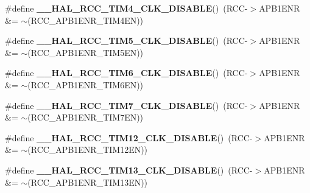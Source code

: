 \begin{DoxyCompactItemize}
\#define {\bfseries \+\_\+\+\_\+\+H\+A\+L\+\_\+\+R\+C\+C\+\_\+\+T\+I\+M4\+\_\+\+C\+L\+K\+\_\+\+D\+I\+S\+A\+B\+LE}()~(R\+CC-\/$>$A\+P\+B1\+E\+NR \&= $\sim$(R\+C\+C\+\_\+\+A\+P\+B1\+E\+N\+R\+\_\+\+T\+I\+M4\+EN))
\item 
\mbox{\label{group___r_c_c_ex___peripheral___clock___enable___disable_ga44f246a1407fadc350e416e4c3256f6e}} 
\#define {\bfseries \+\_\+\+\_\+\+H\+A\+L\+\_\+\+R\+C\+C\+\_\+\+T\+I\+M5\+\_\+\+C\+L\+K\+\_\+\+D\+I\+S\+A\+B\+LE}()~(R\+CC-\/$>$A\+P\+B1\+E\+NR \&= $\sim$(R\+C\+C\+\_\+\+A\+P\+B1\+E\+N\+R\+\_\+\+T\+I\+M5\+EN))
\item 
\mbox{\label{group___r_c_c_ex___peripheral___clock___enable___disable_ga1ee14a6e314a50eee7a1a09482a25abf}} 
\#define {\bfseries \+\_\+\+\_\+\+H\+A\+L\+\_\+\+R\+C\+C\+\_\+\+T\+I\+M6\+\_\+\+C\+L\+K\+\_\+\+D\+I\+S\+A\+B\+LE}()~(R\+CC-\/$>$A\+P\+B1\+E\+NR \&= $\sim$(R\+C\+C\+\_\+\+A\+P\+B1\+E\+N\+R\+\_\+\+T\+I\+M6\+EN))
\item 
\mbox{\label{group___r_c_c_ex___peripheral___clock___enable___disable_ga865f11c3f70a9b85ebc5f09baf60eec9}} 
\#define {\bfseries \+\_\+\+\_\+\+H\+A\+L\+\_\+\+R\+C\+C\+\_\+\+T\+I\+M7\+\_\+\+C\+L\+K\+\_\+\+D\+I\+S\+A\+B\+LE}()~(R\+CC-\/$>$A\+P\+B1\+E\+NR \&= $\sim$(R\+C\+C\+\_\+\+A\+P\+B1\+E\+N\+R\+\_\+\+T\+I\+M7\+EN))
\item 
\mbox{\label{group___r_c_c_ex___peripheral___clock___enable___disable_ga40b70e57e0b7741e6f62d1f2a25b0a3e}} 
\#define {\bfseries \+\_\+\+\_\+\+H\+A\+L\+\_\+\+R\+C\+C\+\_\+\+T\+I\+M12\+\_\+\+C\+L\+K\+\_\+\+D\+I\+S\+A\+B\+LE}()~(R\+CC-\/$>$A\+P\+B1\+E\+NR \&= $\sim$(R\+C\+C\+\_\+\+A\+P\+B1\+E\+N\+R\+\_\+\+T\+I\+M12\+EN))
\item 
\mbox{\label{group___r_c_c_ex___peripheral___clock___enable___disable_ga501dca0467cb5d6119144dbab79243f6}} 
\#define {\bfseries \+\_\+\+\_\+\+H\+A\+L\+\_\+\+R\+C\+C\+\_\+\+T\+I\+M13\+\_\+\+C\+L\+K\+\_\+\+D\+I\+S\+A\+B\+LE}()~(R\+CC-\/$>$A\+P\+B1\+E\+NR \&= $\sim$(R\+C\+C\+\_\+\+A\+P\+B1\+E\+N\+R\+\_\+\+T\+I\+M13\+EN))
\item 

\end{DoxyCompactItemize}
